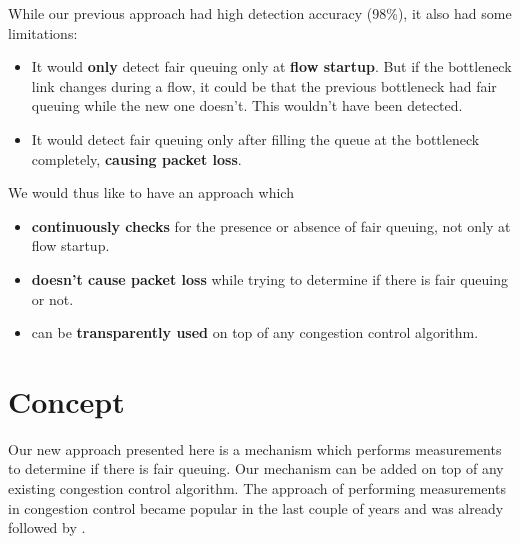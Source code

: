 \documentclass[conference]{IEEEtran}
\begin{document}
While our previous approach had high detection accuracy (98\%), it also had some limitations:
\begin{itemize}
    \item It would \textbf{only} detect fair queuing only at \textbf{flow startup}. 
    But if the bottleneck link changes during a flow, it could be that the previous bottleneck had fair queuing while the new one doesn't. This wouldn't have been detected. 
    \item It would detect fair queuing only after filling the queue at the bottleneck completely, \textbf{causing packet loss}. 
\end{itemize}

We would thus like to have an approach which 
\begin{itemize}
    \item \textbf{continuously checks} for the presence or absence of fair queuing, not only at flow startup. 
    \item \textbf{doesn't cause packet loss} while trying to determine if there is fair queuing or not. 
    \item can be \textbf{transparently used} on top of any congestion control algorithm. 
\end{itemize} 

\section{Concept}

Our new approach presented here is a mechanism which performs measurements to determine if there is fair queuing. Our mechanism can be added on top of any existing congestion control algorithm. 
The approach of performing measurements in congestion control became popular in the last couple of years and was already followed by \cite{cardwell_bbr_2016,dong_pcc_2015,goyal_elasticity_2020,hayes_online_2020}.
\end{document}
